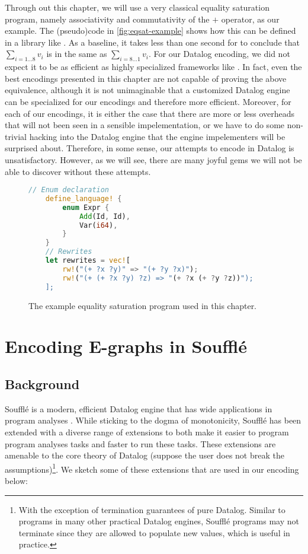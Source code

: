 Through out this chapter, we will use a very classical equality saturation program,
 namely associativity and commutativity of the $+$ operator, as our example.
The (pseudo)code in \autoref{fig:eqsat-example} shows how this can be defined in a library like \egg.
As a baseline, it takes less than one second for \egg to conclude that
 $\sum_{i=1\ldots 8}v_i$ is in the same \eclass as $\sum_{i=8\ldots 1}v_i$.
For our Datalog encoding,
 we did not expect it to be as efficient as highly specialized \egraph frameworks like \egg.
In fact, even the best encodings presented in this chapter
 are not capable of proving the above equivalence,
 although it is not unimaginable that a customized Datalog engine can be specialized
 for our \egraph encodings and therefore more efficient.
Moreover,
 for each of our encodings,
 it is either the case that there are more or less overheads 
 that will not been seen in a sensible \egraph impelementation,
 or we have to do some non-trivial hacking into the Datalog engine that 
 the engine impelementers will be surprised about.
Therefore, in some sense,
 our attempts to encode \egraphs in Datalog is unsatisfactory.
However, 
 as we will see,
 there are many joyful gems we will not be able to discover without these attempts.

\begin{figure}
\begin{lstlisting}[language=Rust, style=colouredRust]
    // Enum declaration
    define_language! {
        enum Expr {
            Add(Id, Id),
            Var(i64),
        }
    }
    // Rewrites
    let rewrites = vec![
        rw!("(+ ?x ?y)" => "(+ ?y ?x)");
        rw!("(+ (+ ?x ?y) ?z) => "(+ ?x (+ ?y ?z))");
    ];
\end{lstlisting}
\caption{The example equality saturation program used in this chapter.}
\label{fig:eqsat-example}
\end{figure}

\section{Encoding E-graphs in Souffl\'e}

\subsection{Background}

Souffl\'e is a modern, efficient Datalog engine 
 that has wide applications in program analyses \citep{doop, souffle, souffle-interpreter}.
While sticking to the dogma of monotonicity, 
 Souffl\'e has been extended with a diverse range of extensions
 to both make it easier to program program analyses tasks
 and faster to run these tasks.
These extensions are amenable to the core theory of Datalog 
 (suppose the user does not break the assumptions)\footnote{With the exception
 of termination guarantees of pure Datalog. 
 Similar to programs in many other practical Datalog engines, 
 Souffl\'e programs may not terminate
 since they are allowed to populate new values, which is useful in practice.}.
We sketch some of these extensions that are used in our encoding below:

